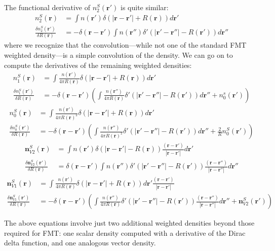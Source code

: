 \documentclass[letterpaper,twocolumn,amsmath,amssymb,jcp,10pt,aip]{revtex4-1}
\newcommand{\rr}{\textbf{r}}
\begin{document}
\begin{widetext}
The functional derivative of $n_2^S(\rr')$ is quite similar:
\begin{align}
  n_2^{S}(\rr) &= \int n(\rr') \delta(|\rr - \rr'| + R(\rr))d\mathbf
  r'\\
  \frac{\delta n_2^{S}(\rr')}{\delta R(\rr)} &= -\delta(\rr-\rr') \int n(\rr'')
  \delta'(|\rr'-\rr''| - R(\rr')) d\rr''
\end{align}
where we recognize that the convolution---while not one of the standard
FMT weighted density---is a simple convolution of the density.  We can
go on to compute the derivatives of the remaining weighted densities:
\begin{align}
  n_1^{S}(\rr) &= \int \frac{n(\rr')}{4\pi R(\rr)} \delta(|\rr - \rr'| + R(\rr))d\mathbf r'\\
    \frac{\delta n_1^{S}(\rr')}{\delta R(\rr)} &=
    -\delta(\rr-\rr') \left( \int \frac{n(\rr'')}{4\pi R(\rr)}
    \delta'(|\rr'-\rr''| - R(\rr')) d\rr''
    + n_0^s(\rr') \right)
\end{align}
\begin{align}
  n_0^{S}(\rr) &= \int \frac{n(\rr')}{4\pi R(\rr)^2} \delta(|\rr - \rr'| + R(\rr))d\mathbf r'\\
    \frac{\delta n_0^{S}(\rr')}{\delta R(\rr)}
    &= -\delta(\rr-\rr') \left( \int \frac{n(\rr'')}{4\pi R(\rr)^2}
    \delta'(|\rr'-\rr''| - R(\rr')) d\rr''
    +
    \frac{2}{R} n_0^S(\rr') \right)
\end{align}
\begin{align}
  \mathbf{n}_{V2}^{S}(\rr) &= \int n(\rr') \delta(|\rr - \rr'| - R(\rr))
  \frac{(\rr - \rr')}{|\rr - \rr'|} d \rr'\\
  \frac{\delta \mathbf{n}_{V2}^{S}(\rr')}{\delta R(\rr)} &= \delta(\rr - \rr')
  \int n(\rr'') \delta'(|\rr' - \rr''| - R(\rr'))
  \frac{(\rr - \rr'')}{|\rr - \rr''|} d\rr''
\end{align}
\begin{align}
 \mathbf{n}_{V1}^{S}(\rr) &= \int \frac{n(\rr')}{4\pi R(\rr)} \delta(|\rr - \rr'| + R(\rr))d\mathbf r'
   \frac{(\rr - \rr')}{|\rr - \rr'|}\\
 \frac{\delta \mathbf{n}_{V1}^{S}(\rr')}{\delta R(\rr)}
 &= -\delta(\rr-\rr')\left(\int \frac{n(\rr'')}{4\pi R(\rr)}
   \delta'(|\rr'-\rr''| - R(\rr')) \frac{(\rr - \rr'')}{|\rr - \rr''|}  d\rr''
   + \mathbf{n}_{V2}^S(\rr') \right)
\end{align}

The above equations involve just two additional weighted densities
beyond those required for FMT: one scalar density computed with a
derivative of the Dirac delta function, and one analogous vector
density.


\end{widetext}
\end{document}
